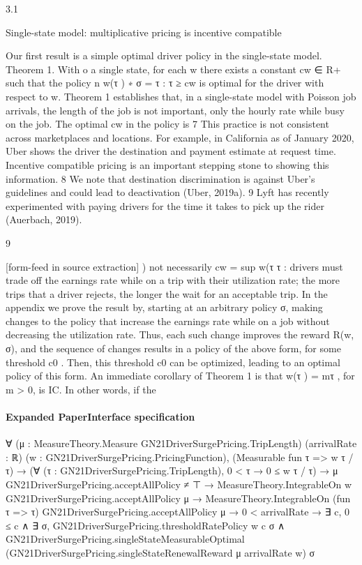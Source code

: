 \documentclass[10pt]{article}
\begin{document}
\begin{ReviewVerbatim}
3.1

Single-state model: multiplicative pricing is incentive compatible

Our first result is a simple optimal driver policy in the single-state model.
Theorem
1. With o
a single state, for each w there exists a constant cw ∈ R+ such that the policy
n
w(τ )
∗
σ = τ : τ ≥ cw is optimal for the driver with respect to w.
Theorem 1 establishes that, in a single-state model with Poisson job arrivals, the length of the
job is not important, only the hourly rate while busy on the job. The optimal cw in the policy is
7
This practice is not consistent across marketplaces and locations. For example, in California as of January 2020,
Uber shows the driver the destination and payment estimate at request time. Incentive compatible pricing is an
important stepping stone to showing this information.
8
We note that destination discrimination is against Uber’s guidelines and could lead to deactivation (Uber, 2019a).
9
Lyft has recently experimented with paying drivers for the time it takes to pick up the rider (Auerbach, 2019).

9


[form-feed in source extraction]
)
not necessarily cw = sup w(τ
τ : drivers must trade off the earnings rate while on a trip with their
utilization rate; the more trips that a driver rejects, the longer the wait for an acceptable trip. In
the appendix we prove the result by, starting at an arbitrary policy σ, making changes to the policy
that increase the earnings rate while on a job without decreasing the utilization rate. Thus, each
such change improves the reward R(w, σ), and the sequence of changes results in a policy of the
above form, for some threshold c0 . Then, this threshold c0 can be optimized, leading to an optimal
policy of this form.
An immediate corollary of Theorem 1 is that w(τ ) = mτ , for m > 0, is IC. In other words, if the
\end{ReviewVerbatim}


\paragraph{Expanded PaperInterface specification}
\begin{ReviewVerbatim}
∀ (μ : MeasureTheory.Measure GN21DriverSurgePricing.TripLength) (arrivalRate : ℝ)
  (w : GN21DriverSurgePricing.PricingFunction),
  (Measurable fun τ => w τ / τ) →
    (∀ (τ : GN21DriverSurgePricing.TripLength), 0 < τ → 0 ≤ w τ / τ) →
      μ GN21DriverSurgePricing.acceptAllPolicy ≠ ⊤ →
        MeasureTheory.IntegrableOn w GN21DriverSurgePricing.acceptAllPolicy μ →
          MeasureTheory.IntegrableOn (fun τ => τ) GN21DriverSurgePricing.acceptAllPolicy μ →
            0 < arrivalRate →
              ∃ c,
                0 ≤ c ∧
                  ∃ σ,
                    GN21DriverSurgePricing.thresholdRatePolicy w c σ ∧
                      GN21DriverSurgePricing.singleStateMeasurableOptimal
                        (GN21DriverSurgePricing.singleStateRenewalReward μ arrivalRate w) σ
\end{ReviewVerbatim}
\end{document}
